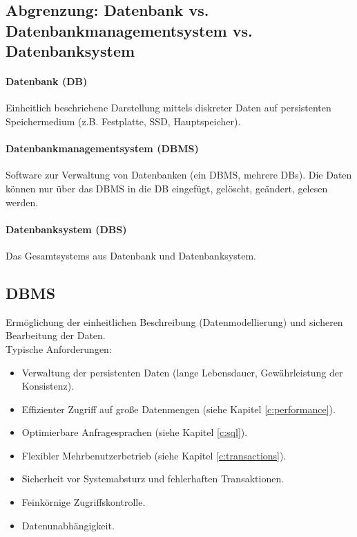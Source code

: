 		\subsection{Abgrenzung: Datenbank vs. Datenbankmanagementsystem vs. Datenbanksystem} %
			\paragraph{Datenbank (DB)}
				Einheitlich beschriebene Darstellung mittels diskreter Daten auf persistenten Speichermedium (z.B. Festplatte, SSD, Hauptspeicher).

			\paragraph{Datenbankmanagementsystem (DBMS)}
				Software zur Verwaltung von Datenbanken (ein DBMS, mehrere DBs). Die Daten können nur über das DBMS in die DB eingefügt, gelöscht, geändert, gelesen werden.

			\paragraph{Datenbanksystem (DBS)}
				Das Gesamtsystems aus Datenbank und Datenbanksystem.

		\subsection{DBMS} %
			Ermöglichung der einheitlichen Beschreibung (Datenmodellierung) und sicheren Bearbeitung der Daten. \\

			Typische Anforderungen:
			\begin{itemize}
				\item Verwaltung der persistenten Daten (lange Lebensdauer, Gewährleistung der Konsistenz).
				\item Effizienter Zugriff auf große Datenmengen (siehe Kapitel \ref{c:performance}).
				\item Optimierbare Anfragesprachen (siehe Kapitel \ref{c:sql}).
				\item Flexibler Mehrbenutzerbetrieb (siehe Kapitel \ref{c:transactions}).
				\item Sicherheit vor Systemabsturz und fehlerhaften Transaktionen.
				\item Feinkörnige Zugriffskontrolle.
				\item Datenunabhängigkeit.
			\end{itemize}

